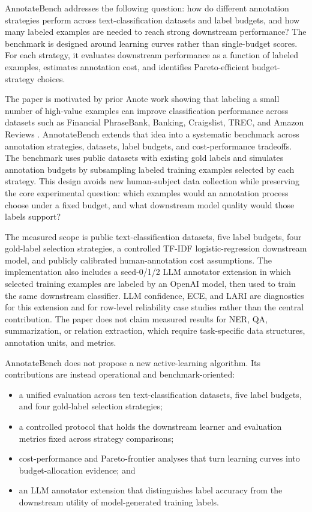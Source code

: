 \documentclass[11pt]{article}
\begin{document}
AnnotateBench addresses the following question: how do different annotation strategies perform across text-classification datasets and label budgets, and how many labeled examples are needed to reach strong downstream performance? The benchmark is designed around learning curves rather than single-budget scores. For each strategy, it evaluates downstream performance as a function of labeled examples, estimates annotation cost, and identifies Pareto-efficient budget-strategy choices.

The paper is motivated by prior Anote work showing that labeling a small number of high-value examples can improve classification performance across datasets such as Financial PhraseBank, Banking, Craigslist, TREC, and Amazon Reviews \citep{vidra2024humanfeedback}. AnnotateBench extends that idea into a systematic benchmark across annotation strategies, datasets, label budgets, and cost-performance tradeoffs. The benchmark uses public datasets with existing gold labels and simulates annotation budgets by subsampling labeled training examples selected by each strategy. This design avoids new human-subject data collection while preserving the core experimental question: which examples would an annotation process choose under a fixed budget, and what downstream model quality would those labels support?

The measured scope is public text-classification datasets, five label budgets, four gold-label selection strategies, a controlled TF-IDF logistic-regression downstream model, and publicly calibrated human-annotation cost assumptions. The implementation also includes a seed-0/1/2 LLM annotator extension in which selected training examples are labeled by an OpenAI model, then used to train the same downstream classifier. LLM confidence, ECE, and LARI are diagnostics for this extension and for row-level reliability case studies rather than the central contribution. The paper does not claim measured results for NER, QA, summarization, or relation extraction, which require task-specific data structures, annotation units, and metrics.

AnnotateBench does not propose a new active-learning algorithm. Its contributions are instead operational and benchmark-oriented:
\begin{itemize}
  \item a unified evaluation across ten text-classification datasets, five label budgets, and four gold-label selection strategies;
  \item a controlled protocol that holds the downstream learner and evaluation metrics fixed across strategy comparisons;
  \item cost-performance and Pareto-frontier analyses that turn learning curves into budget-allocation evidence; and
  \item an LLM annotator extension that distinguishes label accuracy from the downstream utility of model-generated training labels.
\end{itemize}
\end{document}
